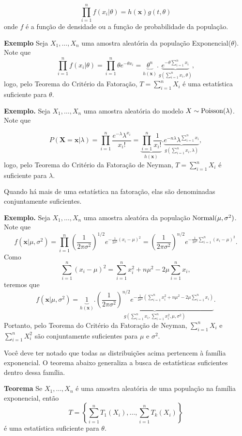 \documentclass[
  letterpaper,
  DIV=11,
  numbers=noendperiod]{scrartcl}
\begin{document}
\[\prod_{i=1}^nf(x_i|\theta)=h(\textbf{x})g(t,\theta)\] onde \(f\) é a
função de densidade ou a função de probabilidade da população.

\textbf{Exemplo} Seja \(X_1,\ldots,X_n\) uma amostra aleatória da
população Exponencial(\(\theta\)). Note que
\[\prod_{i=1}^n  f(x_i|\theta)=\prod_{i=1}^n \theta e^{-\theta x_i}=\underbrace{\theta^n}_{h(\textbf{x})}. \underbrace{e^{-\theta\sum_{i=1}^n x_i}}_{g(\sum_{i=1}^n x_i,\theta)},\]
logo, pelo Teorema do Critério da Fatoração, \(T=\sum_{i=1}^{n}X_i\) é
uma estatística suficiente para \(\theta\).

\textbf{Exemplo.} Seja \(X_1,\ldots,X_n\) uma amostra aleatória do
modelo \(X\sim\hbox{Poisson}(\lambda)\). Note que

\[P(\textbf{X}=\textbf{x}|\lambda)=\prod_{i=1}^n\frac{e^{-\lambda}\lambda^{x_i}}{x_i!}=\underbrace{\prod_{i=1}^n\frac{1}{x_i!}}_{h(\textbf{x})}.\underbrace{e^{-n\lambda}\lambda^{\sum_{i=1}^n x_i}}_{g(\sum_{i=1}^n x_i,\lambda)},\]
logo, pelo Teorema do Critério da Fatoração de Neyman,
\(T=\sum_{i=1}^n X_i\) é suficiente para \(\lambda\).

Quando há mais de uma estatística na fatoração, elas são denominadas
conjuntamente suficientes.

\textbf{Exemplo.} Seja \(X_1,\ldots,X_n\) uma amostra aleatóra da
população \(\hbox{Normal}(\mu,\sigma^2)\). Note que
\[f(\textbf{x}|\mu,\sigma^2)=\prod_{i=1}^n\left(\frac{1}{2\pi\sigma^2}\right)^{1/2} e^{-\frac{1}{2\sigma^2}(x_i-\mu)^2}=\left(\frac{1}{2\pi\sigma^2}\right)^{n/2} e^{-\frac{1}{2\sigma^2}\sum_{i=1}^n(x_i-\mu)^2}.\]
Como
\[\sum_{i=1}^n(x_i-\mu)^2=\sum_{i=1}^n x_i^2 +n\mu^2-2\mu\sum_{i=1}^n x_i,\]
teremos que
\[f(\textbf{x}|\mu,\sigma^2)=\underbrace{1}_{h(\textbf{x})}.\underbrace{\left(\frac{1}{2\pi\sigma^2}\right)^{n/2} e^{-\frac{1}{2\sigma^2}\left(\sum_{i=1}^n x_i^2 +n\mu^2-2\mu\sum_{i=1}^n x_i\right)}}_{g( \sum_{i=1}^n x_{i},\sum_{i=1}^n x_i^2,\mu,\sigma^2)}.\]
Portanto, pelo Teorema do Critério da Fatoração de Neyman,
\(\sum_{i=1}^nX_i\) e \(\sum_{i=1}^n X_i^2\) são conjuntamente
suficientes para \(\mu\) e \(\sigma^2\).

Você deve ter notado que todas as distribuições acima pertencem à
família exponencial. O teorema abaixo generaliza a busca de estatísticas
suficientes dentro dessa família.

\textbf{Teorema} Se \(X_1,\ldots,X_n\) é uma amostra aleatória de uma
população na família exponencial, então
\[T=\left\{\sum_{i=1}^n T_1(X_i),\ldots,\sum_{i=1}^n T_k(X_i)\right\}\]
é uma estatística suficiente para \(\theta\).
\end{document}
